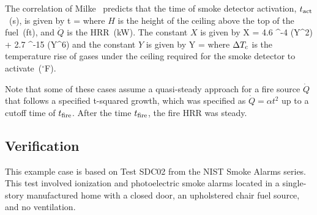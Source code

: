 The correlation of Milke~\cite{Milke:1} predicts that the time of smoke detector activation, $t\sb{act}$~(\si{s}), is given by
\be
t = 
\label{eq:Milke}
\ee
where $H$ is the height of the ceiling above the top of the fuel~(\si{ft}), and $\dot Q$ is the HRR~(\si{kW}). The constant $X$ is given by
\be
X = 4.6 ^{-4} (Y^2) + 2.7 ^{-15} (Y^6)
\label{eq:Milke_X}
\ee
and the constant $Y$ is given by
\be
Y = 
\label{eq:Milke_Y}
\ee
where $\Delta T\sb{c}$ is the temperature rise of gases under the ceiling required for the smoke detector to activate~($^\circ$F).

Note that some of these cases assume a quasi-steady approach for a fire source $\dot Q$ that follows a specified t-squared growth, which was specified as $\dot Q = \alpha t^2$ up to a cutoff time of $t\sb{fire}$. After the time $t\sb{fire}$, the fire HRR was steady.

\subsection*{Verification}

This example case is based on Test SDC02 from the NIST Smoke Alarms series. This test involved ionization and photoelectric smoke alarms located in a single-story manufactured home with a closed door, an upholstered chair fuel source, and no ventilation.

